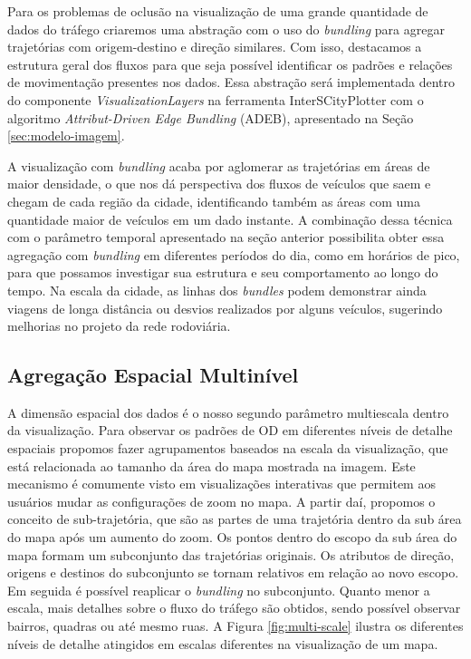 Para os problemas de oclusão na visualização de uma grande quantidade de dados
do tráfego criaremos uma abstração com o uso do \emph{bundling} para agregar
trajetórias com origem-destino e direção similares. Com isso, destacamos a
estrutura geral dos fluxos para que seja possível identificar os padrões e
relações de movimentação presentes nos  dados. Essa abstração será implementada
dentro do componente \emph{VisualizationLayers} na ferramenta InterSCityPlotter
com o algoritmo \emph{Attribut-Driven Edge Bundling} (ADEB), apresentado na
Seção \ref{sec:modelo-imagem}.

 A visualização com \emph{bundling} acaba por aglomerar as trajetórias em áreas
de maior densidade, o que nos dá perspectiva dos fluxos de veículos que saem e
chegam de cada região da cidade, identificando também as áreas com uma
quantidade maior de veículos em um dado instante. A combinação dessa técnica
com o parâmetro temporal apresentado na seção anterior possibilita obter essa
agregação com \emph{bundling} em diferentes períodos do dia, como em horários
de pico, para que possamos investigar sua estrutura e seu comportamento ao
longo do tempo. Na escala da cidade, as linhas dos \emph{bundles} podem
demonstrar ainda viagens de longa distância ou desvios realizados por alguns
veículos, sugerindo melhorias no projeto da rede rodoviária.

\subsection{Agregação Espacial Multinível}

  A dimensão espacial dos dados é o nosso segundo parâmetro multiescala dentro
da visualização. Para observar os padrões de OD em diferentes níveis de detalhe
espaciais propomos fazer agrupamentos baseados na escala da visualização, que
está relacionada ao tamanho da área do mapa mostrada na imagem. Este mecanismo
é comumente visto em visualizações interativas que permitem aos usuários mudar
as configurações de zoom no mapa. A partir daí, propomos o conceito de
sub-trajetória, que são as partes de uma trajetória dentro da sub área do mapa
após um aumento do zoom. Os pontos dentro do escopo da sub área do mapa formam
um subconjunto das trajetórias originais. Os atributos de direção, origens e
destinos do subconjunto se tornam relativos em relação ao novo escopo. Em
seguida é possível reaplicar o \emph{bundling} no subconjunto. Quanto menor a
escala, mais detalhes sobre o fluxo do tráfego são obtidos, sendo possível
observar bairros, quadras ou até mesmo ruas. A Figura \ref{fig:multi-scale}
ilustra os diferentes níveis de detalhe atingidos em escalas diferentes na
visualização de um mapa.

